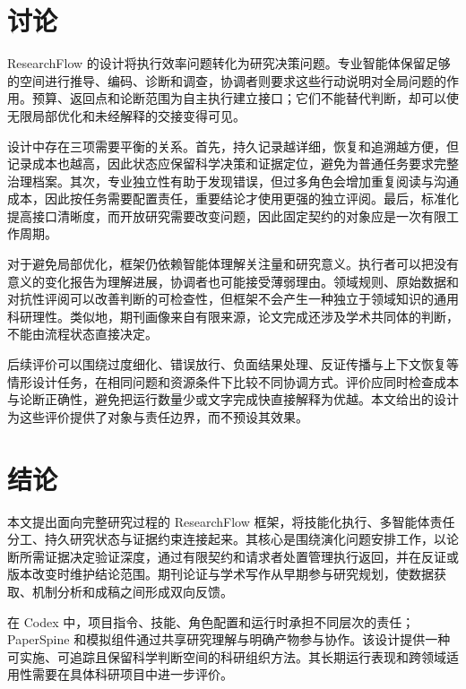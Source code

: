 \documentclass[UTF8,fontset=fandol,a4paper,11pt]{ctexart}
\begin{document}
\section{讨论}

ResearchFlow 的设计将执行效率问题转化为研究决策问题。专业智能体保留足够的空间进行推导、编码、诊断和调查，协调者则要求这些行动说明对全局问题的作用。预算、返回点和论断范围为自主执行建立接口；它们不能替代判断，却可以使无限局部优化和未经解释的交接变得可见。

设计中存在三项需要平衡的关系。首先，持久记录越详细，恢复和追溯越方便，但记录成本也越高，因此状态应保留科学决策和证据定位，避免为普通任务要求完整治理档案。其次，专业独立性有助于发现错误，但过多角色会增加重复阅读与沟通成本，因此按任务需要配置责任，重要结论才使用更强的独立评阅。最后，标准化提高接口清晰度，而开放研究需要改变问题，因此固定契约的对象应是一次有限工作周期。

对于避免局部优化，框架仍依赖智能体理解关注量和研究意义。执行者可以把没有意义的变化报告为理解进展，协调者也可能接受薄弱理由。领域规则、原始数据和对抗性评阅可以改善判断的可检查性，但框架不会产生一种独立于领域知识的通用科研理性。类似地，期刊画像来自有限来源，论文完成还涉及学术共同体的判断，不能由流程状态直接决定。

后续评价可以围绕过度细化、错误放行、负面结果处理、反证传播与上下文恢复等情形设计任务，在相同问题和资源条件下比较不同协调方式。评价应同时检查成本与论断正确性，避免把运行数量少或文字完成快直接解释为优越。本文给出的设计为这些评价提供了对象与责任边界，而不预设其效果。

\section{结论}

本文提出面向完整研究过程的 ResearchFlow 框架，将技能化执行、多智能体责任分工、持久研究状态与证据约束连接起来。其核心是围绕演化问题安排工作，以论断所需证据决定验证深度，通过有限契约和请求者处置管理执行返回，并在反证或版本改变时维护结论范围。期刊论证与学术写作从早期参与研究规划，使数据获取、机制分析和成稿之间形成双向反馈。

在 Codex 中，项目指令、技能、角色配置和运行时承担不同层次的责任；PaperSpine 和模拟组件通过共享研究理解与明确产物参与协作。该设计提供一种可实施、可追踪且保留科学判断空间的科研组织方法。其长期运行表现和跨领域适用性需要在具体科研项目中进一步评价。
\end{document}

